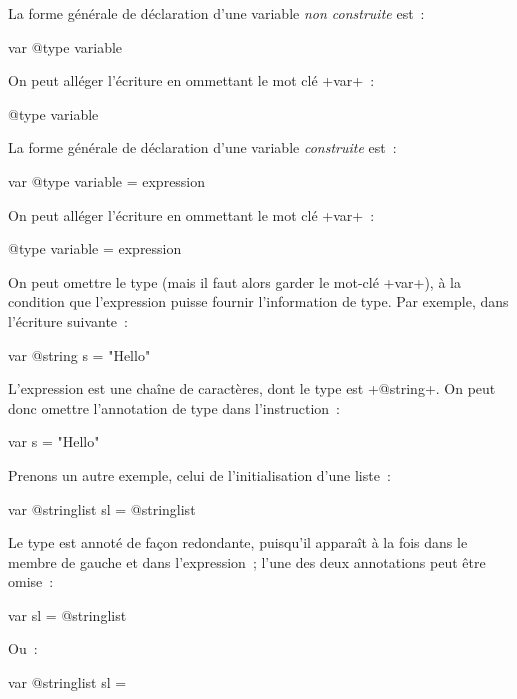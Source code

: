 La forme générale de déclaration d'une variable \emph{non construite} est~:
\begin{galgasbox}
var @type variable
\end{galgasbox}


On peut alléger l'écriture en ommettant le mot clé \ggs+var+~:
\begin{galgasbox}
@type variable
\end{galgasbox}





La forme générale de déclaration d'une variable \emph{construite} est~:
\begin{galgasbox}
var @type variable = expression
\end{galgasbox}

On peut alléger l'écriture en ommettant le mot clé \ggs+var+~:
\begin{galgasbox}
@type variable = expression
\end{galgasbox}

On peut omettre le type (mais il faut alors garder le mot-clé \ggs+var+), à la condition que l'expression puisse fournir l'information de type. Par exemple, dans l'écriture suivante~:
\begin{galgas}
var @string s = "Hello"
\end{galgas}

L'expression est une chaîne de caractères, dont le type est \ggs+@string+. On peut donc omettre l'annotation de type dans l'instruction~:
\begin{galgas}
var s = "Hello"
\end{galgas}


Prenons un autre exemple, celui de l'initialisation d'une liste~:
\begin{galgas}
var @stringlist sl = @stringlist {}
\end{galgas}

Le type est annoté de façon redondante, puisqu'il apparaît à la fois dans le membre de gauche et dans l'expression~; l'une des deux annotations peut être omise~:
\begin{galgas}
var sl = @stringlist {}
\end{galgas}

Ou~:
\begin{galgas}
var @stringlist sl = {}
\end{galgas}

